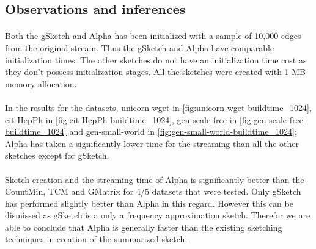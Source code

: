\subsection*{Observations and inferences}

\paragraph{}
Both the gSketch and Alpha has been initialized with a sample of 10,000 edges from the original stream. Thus the gSketch and Alpha have comparable initialization times. The other sketches do not have an initialization time cost as they don't possess initialization stages. All the sketches were created with 1 MB memory allocation.

\paragraph{}
In the results for the datasets, unicorn-wget in \autoref{fig:unicorn-wget-buildtime_1024}, cit-HepPh in \autoref{fig:cit-HepPh-buildtime_1024}, gen-scale-free in \autoref{fig:gen-scale-free-buildtime_1024} and gen-small-world in \autoref{fig:gen-small-world-buildtime_1024}; Alpha has taken a significantly lower time for the streaming than all the other sketches except for gSketch.

\paragraph{}
Sketch creation and the streaming time of Alpha is significantly better than the CountMin, TCM and GMatrix for 4/5 datasets that were tested. Only gSketch has performed slightly better than Alpha in this regard. However this can be dismissed as gSketch is a only a frequency approximation sketch. Therefor we are able to conclude that Alpha is generally faster than the existing sketching techniques in creation of the summarized sketch.